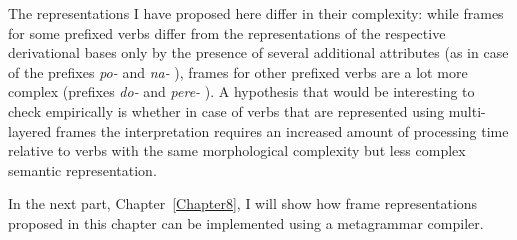 The representations I have proposed here differ in their complexity: while frames for some prefixed verbs differ from the representations of the respective derivational bases only by the presence of several additional attributes (as in case of the prefixes \textit{po-}   and \textit{na-}  ), frames for other prefixed verbs are a lot more complex (prefixes \textit{do-}   and \textit{pere-}  ). A hypothesis that would be interesting to check empirically is whether in case of verbs that are represented using multi-layered frames the interpretation requires an increased amount of processing time relative to verbs with the same morphological complexity but less complex semantic representation.


In the next part, Chapter~\ref{Chapter8}, I will show how frame representations proposed in this chapter can be implemented using a metagrammar compiler.
